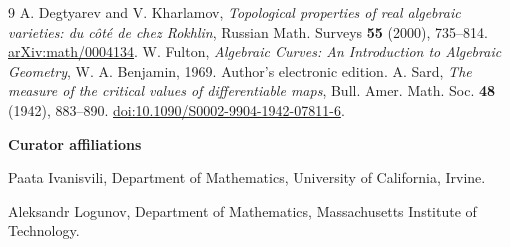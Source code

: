 \documentclass[11pt,letterpaper]{article}
\begin{document}
\begin{thebibliography}{9}
 A. Degtyarev and V. Kharlamov, \emph{Topological properties of real algebraic varieties: du c\^ot\'e de chez Rokhlin}, Russian Math. Surveys \textbf{55} (2000), 735--814. \href{https://arxiv.org/abs/math/0004134}{arXiv:math/0004134}.
 W. Fulton, \emph{Algebraic Curves: An Introduction to Algebraic Geometry}, W. A. Benjamin, 1969. Author's electronic edition.
 A. Sard, \emph{The measure of the critical values of differentiable maps}, Bull. Amer. Math. Soc. \textbf{48} (1942), 883--890. \href{https://doi.org/10.1090/S0002-9904-1942-07811-6}{doi:10.1090/S0002-9904-1942-07811-6}.
\end{thebibliography}
\noindent\textbf{Curator affiliations}\par
Paata Ivanisvili, Department of Mathematics, University of California, Irvine.\par
Aleksandr Logunov, Department of Mathematics, Massachusetts Institute of Technology.
\end{document}
